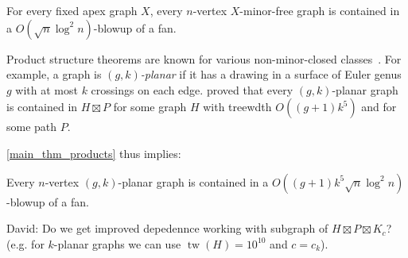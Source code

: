 \documentclass{patmorin}
\newcommand{\david}[1]{{\color{orange} David: #1}}
\newcommand{\defin}[1]{\emph{\textcolor{brightmaroon}{#1}}}
\DeclareMathOperator{\tw}{tw}
\begin{document}
\begin{thm}\label{apex_products}
For every fixed apex graph $X$, every $n$-vertex $X$-minor-free graph is contained in a $O(\sqrt{n}\log^2 n)$-blowup of a fan.
\end{thm}

Product structure theorems are known for various non-minor-closed classes~\citep{dujmovic.morin.ea:graph,HW24,distel.hickingbotham.ea:powers}. For example, a graph is \defin{$(g,k)$-planar} if it has a drawing in a surface of Euler genus $g$ with at most $k$ crossings on each edge. \citet{dujmovic.morin.ea:graph} proved that every $(g,k)$-planar graph is contained in $H\boxtimes P$ for some graph $H$ with treewdth $O((g+1)k^5)$ and for some path $P$.

\cref{main_thm_products} thus implies:

\begin{thm}\label{gkplanar_products}
Every $n$-vertex $(g,k)$-planar graph is contained in a $O((g+1)k^5\sqrt{n}\log^2 n)$-blowup of a fan.
\end{thm}

\david{
Do we get improved depedennce working with subgraph of $H\boxtimes P \boxtimes K_c$? (e.g. for $k$-planar graphs we can use $\tw(H)=10^{10}$ and $c=c_k$).
}
\end{document}
